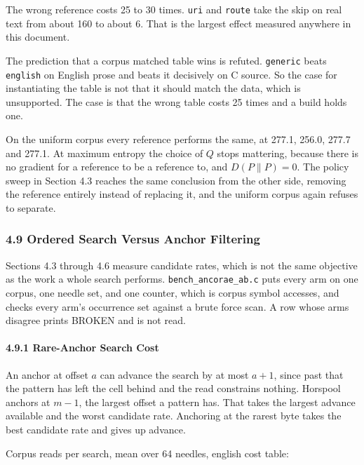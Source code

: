 The wrong reference costs 25 to 30 times. \texttt{uri} and \texttt{route} take the skip on real text from about 160 to about 6. That is the largest effect measured anywhere in this document.

The prediction that a corpus matched table wins is refuted. \texttt{generic} beats \texttt{english} on English prose and beats it decisively on C source. So the case for instantiating the table is not that it should match the data, which is unsupported. The case is that the wrong table costs 25 times and a build holds one.

On the uniform corpus every reference performs the same, at 277.1, 256.0, 277.7 and 277.1. At maximum entropy the choice of \(Q\) stops mattering, because there is no gradient for a reference to be a reference to, and \(D(P\|P) = 0\). The policy sweep in Section 4.3 reaches the same conclusion from the other side, removing the reference entirely instead of replacing it, and the uniform corpus again refuses to separate.

\subsubsection{4.9 Ordered Search Versus Anchor Filtering}

Sections 4.3 through 4.6 measure candidate rates, which is not the same objective as the work a whole search performs. \texttt{bench\_\allowbreak{}ancorae\_\allowbreak{}ab.\allowbreak{}c} puts every arm on one corpus, one needle set, and one counter, which is corpus symbol accesses, and checks every arm's occurrence set against a brute force scan. A row whose arms disagree prints BROKEN and is not read.

\paragraph{4.9.1 Rare-Anchor Search Cost}

An anchor at offset \(a\) can advance the search by at most \(a+1\), since past that the pattern has left the cell behind and the read constrains nothing. Horspool anchors at \(m-1\), the largest offset a pattern has. That takes the largest advance available and the worst candidate rate. Anchoring at the rarest byte takes the best candidate rate and gives up advance.

Corpus reads per search, mean over 64 needles, english cost table:

